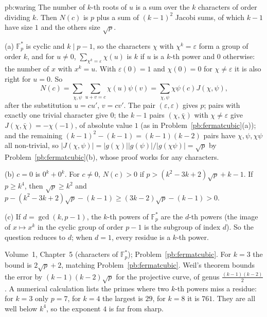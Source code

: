 \begin{solution}{pb:waring}
\idea The number of $k$-th roots of $u$ is a sum over the $k$ characters of order dividing $k$. Then $N(c)$ is $p$ plus a sum of
$(k-1)^2$ Jacobi sums, of which $k-1$ have size $1$ and the others size $\sqrt p$.

\writeup (a) $\mathbb F_p^*$ is cyclic and $k\mid p-1$, so the characters $\chi$ with $\chi^k=\varepsilon$ form a group of order $k$,
and for $u\ne0$, $\sum_{\chi^k=\varepsilon}\chi(u)$ is $k$ if $u$ is a $k$-th power and $0$ otherwise: the number of $x$ with $x^k=u$.
With $\varepsilon(0)=1$ and $\chi(0)=0$ for $\chi\ne\varepsilon$ it is also right for $u=0$. So
\[
N(c)=\sum_{\chi,\psi}\sum_{u+v=c}\chi(u)\psi(v)=\sum_{\chi,\psi}\chi\psi(c)J(\chi,\psi),
\]
after the substitution $u=cu'$, $v=cv'$. The pair $(\varepsilon,\varepsilon)$ gives $p$; pairs with exactly one trivial character
give $0$; the $k-1$ pairs $(\chi,\bar\chi)$ with $\chi\ne\varepsilon$ give $J(\chi,\bar\chi)=-\chi(-1)$, of absolute value $1$ (as in
Problem~\ref{pb:fermatcubic}(a)); and the remaining $(k-1)^2-(k-1)=(k-1)(k-2)$ pairs have $\chi,\psi,\chi\psi$ all non-trivial,
so $|J(\chi,\psi)|=|g(\chi)||g(\psi)|/|g(\chi\psi)|=\sqrt p$ by Problem~\ref{pb:fermatcubic}(b), whose proof works for any characters.

(b) $c=0$ is $0^k+0^k$. For $c\ne0$, $N(c)>0$ if $p>(k^2-3k+2)\sqrt p+k-1$. If $p\ge k^4$, then $\sqrt p\ge k^2$ and
$p-(k^2-3k+2)\sqrt p-(k-1)\ge(3k-2)\sqrt p-(k-1)>0$.

(c) If $d=\gcd(k,p-1)$, the $k$-th powers of $\mathbb F_p^*$ are the $d$-th powers (the image of $x\mapsto x^k$ in the cyclic group
of order $p-1$ is the subgroup of index $d$). So the question reduces to $d$; when $d=1$, every residue is a $k$-th power.

\tools Volume~1, Chapter~5 (characters of $\mathbb F_p^*$); Problem~\ref{pb:fermatcubic}.
\leads For $k=3$ the bound is $2\sqrt p+2$, matching Problem~\ref{pb:fermatcubic}. Weil's theorem bounds the error by
$(k-1)(k-2)\sqrt p$ for the projective curve, of genus $\frac{(k-1)(k-2)}2$. A numerical calculation lists the primes where two $k$-th powers
miss a residue: for $k=3$ only $p=7$, for $k=4$ the largest is $29$, for $k=8$ it is $761$. They are all well below $k^4$, so the
exponent $4$ is far from sharp.
\end{solution}

